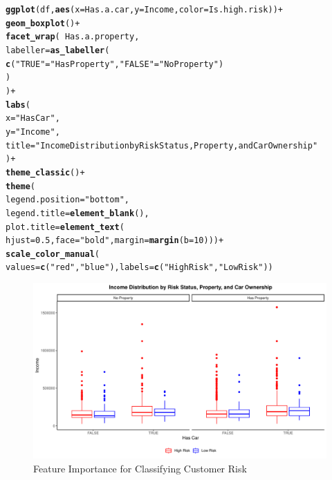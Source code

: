 \documentclass{article}\usepackage[]{graphicx}\usepackage[]{xcolor}
\makeatletter
\def\maxwidth{ %
  \ifdim\Gin@nat@width>\linewidth
    \linewidth
  \else
    \Gin@nat@width
  \fi
}
\newcommand{\hlnum}[1]{\textcolor[rgb]{0.686,0.059,0.569}{#1}}%
\newcommand{\hlsng}[1]{\textcolor[rgb]{0.192,0.494,0.8}{#1}}%
\newcommand{\hlopt}[1]{\textcolor[rgb]{0,0,0}{#1}}%
\newcommand{\hldef}[1]{\textcolor[rgb]{0.345,0.345,0.345}{#1}}%
\newcommand{\hlkwc}[1]{\textcolor[rgb]{0.333,0.667,0.333}{#1}}%
\newcommand{\hlkwd}[1]{\textcolor[rgb]{0.737,0.353,0.396}{\textbf{#1}}}%
\newenvironment{kframe}{%
 \def\at@end@of@kframe{}%
 \ifinner\ifhmode%
  \def\at@end@of@kframe{\end{minipage}}%
  \begin{minipage}{\columnwidth}%
 \fi\fi%
 \def\FrameCommand##1{\hskip\@totalleftmargin \hskip-\fboxsep
 \colorbox{shadecolor}{##1}\hskip-\fboxsep
     \hskip-\linewidth \hskip-\@totalleftmargin \hskip\columnwidth}%
 \MakeFramed {\advance\hsize-\width
   \@totalleftmargin\z@ \linewidth\hsize
   \@setminipage}}%
 {\par\unskip\endMakeFramed%
 \at@end@of@kframe}
\newenvironment{knitrout}{}{} %
\makeatother
\begin{document}
\begin{knitrout}
\color{fgcolor}\begin{kframe}
\begin{alltt}
\hlkwd{ggplot}\hldef{(df,} \hlkwd{aes}\hldef{(}\hlkwc{x} \hldef{= Has.a.car,} \hlkwc{y} \hldef{= Income,} \hlkwc{color} \hldef{= Is.high.risk))} \hlopt{+}
  \hlkwd{geom_boxplot}\hldef{()} \hlopt{+}
  \hlkwd{facet_wrap}\hldef{(}\hlopt{~} \hldef{Has.a.property,}
             \hlkwc{labeller} \hldef{=} \hlkwd{as_labeller}\hldef{(}
               \hlkwd{c}\hldef{(}\hlsng{"TRUE"} \hldef{=} \hlsng{"Has Property"}\hldef{,} \hlsng{"FALSE"} \hldef{=} \hlsng{"No Property"}\hldef{)}
             \hldef{)}
  \hldef{)} \hlopt{+}
  \hlkwd{labs}\hldef{(}
    \hlkwc{x} \hldef{=} \hlsng{"Has Car"}\hldef{,}
    \hlkwc{y} \hldef{=} \hlsng{"Income"}\hldef{,}
    \hlkwc{title} \hldef{=} \hlsng{"Income Distribution by Risk Status, Property, and Car Ownership"}
  \hldef{)} \hlopt{+}
  \hlkwd{theme_classic}\hldef{()} \hlopt{+}
  \hlkwd{theme}\hldef{(}
    \hlkwc{legend.position} \hldef{=} \hlsng{"bottom"}\hldef{,}
    \hlkwc{legend.title} \hldef{=} \hlkwd{element_blank}\hldef{(),}
    \hlkwc{plot.title} \hldef{=} \hlkwd{element_text}\hldef{(}
      \hlkwc{hjust} \hldef{=} \hlnum{0.5}\hldef{,} \hlkwc{face} \hldef{=} \hlsng{"bold"}\hldef{,} \hlkwc{margin} \hldef{=} \hlkwd{margin}\hldef{(}\hlkwc{b} \hldef{=} \hlnum{10}\hldef{)))} \hlopt{+}
  \hlkwd{scale_color_manual}\hldef{(}
    \hlkwc{values} \hldef{=} \hlkwd{c}\hldef{(}\hlsng{"red"}\hldef{,} \hlsng{"blue"}\hldef{),} \hlkwc{labels} \hldef{=} \hlkwd{c}\hldef{(}\hlsng{"High Risk"}\hldef{,} \hlsng{"Low Risk"}\hldef{))}
\end{alltt}
\end{kframe}\begin{figure}[H]
\includegraphics[width=\maxwidth]{figure/unnamed-chunk-47-1} \caption[Feature Importance for Classifying Customer Risk]{Feature Importance for Classifying Customer Risk}\label{fig:unnamed-chunk-47}
\end{figure}

\end{knitrout}
\end{document}
